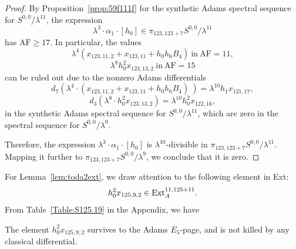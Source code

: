 \documentclass{amsart}
\numberwithin{equation}{section}
\newcommand{\AF}{\mathrm{AF}}
\begin{document}
\begin{proof}
By Proposition~\ref{prop:59f111f} for the synthetic Adams spectral sequence for $S^{0,0}/\lambda^{11}$, the expression 
$$\lambda^3 \cdot \alpha_1 \cdot [h_0] \in  \pi_{123,123+7} S^{0,0}/\lambda^{11}$$
has $\AF \ge 17$. %
In particular, the values $$\lambda^4(x_{123,11,2}+x_{123,11}+h_0h_6B_4) \ \text{in} \ \AF=11,$$ 
$$\lambda^8 h_0^2x_{123,13,2} \ \text{in} \ \AF=15$$
can be ruled out due to the nonzero Adams differentials
$$d_7( \lambda^4 \cdot (x_{123,11,2}+x_{123,11}+h_0h_6B_4) \ ) = \lambda^{10} h_1x_{121,17},$$
$$d_3 (\lambda^8 \cdot h_0^2x_{123,13,2}) = \lambda^{10} h_0^2 x_{122,16},$$
in the synthetic Adams spectral sequence for $S^{0,0}/\lambda^{11}$, which are zero in the spectral sequence for $S^{0,0}/\lambda^{9}$.

Therefore, the expression $\lambda^3 \cdot \alpha_1 \cdot [h_0]$ is $\lambda^{10}$-divisible in $\pi_{123,123+7} S^{0,0}/\lambda^{11}$. Mapping it further to $\pi_{123,123+7} S^{0,0}/\lambda^9$, we conclude that it is zero. 
\end{proof}







For Lemma~\ref{lem:toda2ext}, we draw attention to the following element in Ext:
$$h_0^2x_{125,9,2} \in \mathrm{Ext}_A^{11, 125+11}.$$
From Table~\ref{Table:S125.19} in the Appendix, we have
\begin{fact} \label{fact:h02x1259}
    The element $h_0^2x_{125,9,2}$ survives to the Adams $E_5$-page, and is not killed by any classical differential.
\end{fact}
\end{document}
